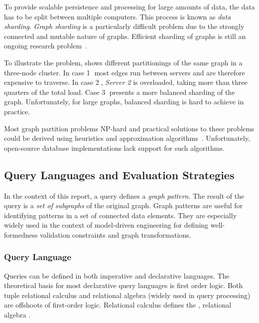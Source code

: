 To provide scalable persistence and processing for large amounts of data, the data has to be split between multiple computers. This process is known as \emph{data sharding}. \emph{Graph sharding} is a particularly difficult problem due to the strongly connected and mutable nature of graphs. Efficient sharding of graphs is still an ongoing research problem~\cite{ShardingGraph}.


To illustrate the problem,  shows different partitionings of the same graph in a three-node cluster.
In case \textcircled{1} most edges run between servers and are therefore expensive to traverse.
In case \textcircled{2}, \emph{Server 2} is overloaded, taking more than three quarters of the total load.
Case \textcircled{3} presents a more balanced sharding of the graph.
Unfortunately, for large graphs, balanced sharding is hard to achieve in practice.

Most graph partition problems NP-hard and practical solutions to these problems could be derived using heuristics and approximation algorithms~\cite{conf/stacs/FeldmannF12}. Unfortunately, open-source database implementations lack support for such algorithms.





\subsection{Query Languages and Evaluation Strategies}

In the context of this report, a query defines a \emph{graph pattern}. The result of the query is a \emph{set of subgraphs} of the original graph. Graph patterns are useful for identifying patterns in a set of connected data elements. They are especially widely used in the context of model-driven engineering for defining well-formedness validation constraints and graph transformations.

\subsubsection{Query Language}

Queries can be defined in both imperative and declarative languages. The theoretical basis for most declarative query languages is first order logic. Both tuple relational calculus and relational algebra (widely used in query processing) are offshoots of first-order logic. Relational calculus defines the , relational algebra .

